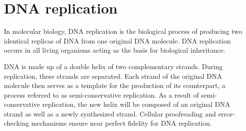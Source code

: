 \hypertarget{dna-replication-1}{%
\chapter{DNA replication}\label{dna-replication-1}}

In molecular biology, DNA replication is the biological process of producing two identical replicas of DNA from one original DNA molecule. DNA replication occurs in all living organisms acting as the basis for biological inheritance.

DNA is made up of a double helix of two complementary strands. During replication, these strands are separated. Each strand of the original DNA molecule then serves as a template for the production of its counterpart, a process referred to as semi-conservative replication. As a result of semi-conservative replication, the new helix will be composed of an original DNA strand as well as a newly synthesized strand. Cellular proofreading and error-checking mechanisms ensure near perfect fidelity for DNA replication.




